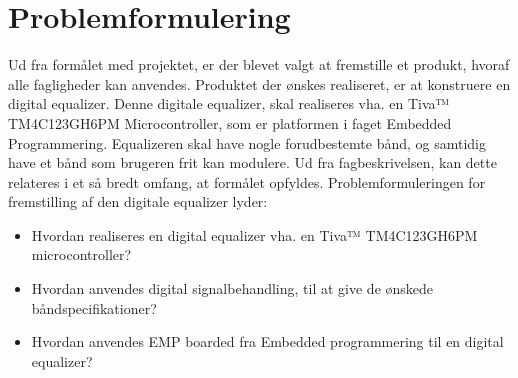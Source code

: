 \section{Problemformulering}
%
%


%
Ud fra formålet med projektet, er der blevet valgt at fremstille et produkt, hvoraf alle fagligheder kan anvendes. Produktet der ønskes realiseret, er at konstruere en digital equalizer. Denne digitale equalizer, skal realiseres vha. en Tiva™ TM4C123GH6PM Microcontroller, som er platformen i faget Embedded Programmering. Equalizeren skal have nogle forudbestemte bånd, og samtidig have et bånd som brugeren frit kan modulere. Ud fra fagbeskrivelsen, kan dette relateres i et så bredt omfang, at formålet opfyldes. Problemformuleringen for fremstilling af den digitale equalizer lyder: 
\begin{itemize}
	\item Hvordan realiseres en digital equalizer vha. en Tiva™ TM4C123GH6PM microcontroller?
	\item Hvordan anvendes digital signalbehandling, til at give de ønskede båndspecifikationer?
	\item Hvordan anvendes EMP boarded fra Embedded programmering til en digital equalizer?
\end{itemize}

